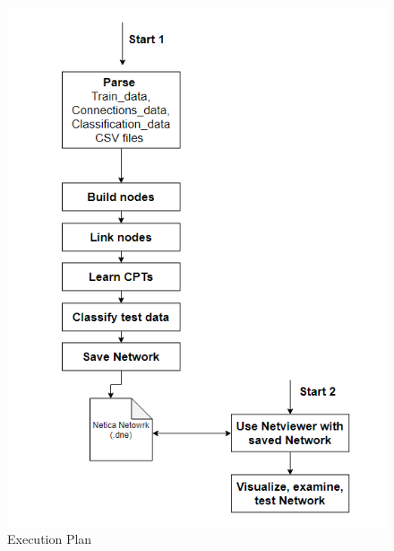 \documentclass[12pt]{scrartcl}
\begin{document}
\begin{figure}[H]
    \centering
    \includegraphics[height=0.8\textheight]{img/workflow.PNG}
    \caption{Execution Plan}
    \label{fig:exec_plan}
\end{figure}
\end{document}
